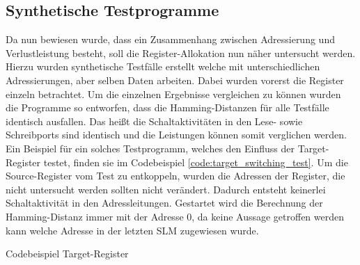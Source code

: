 \subsection{Synthetische Testprogramme}
Da nun bewiesen wurde, dass ein Zusammenhang zwischen Adressierung und Verlustleistung besteht, soll die Register-Allokation nun näher untersucht werden. Hierzu wurden synthetische Testfälle erstellt welche mit unterschiedlichen Adressierungen, aber selben Daten arbeiten. Dabei wurden vorerst die Register einzeln betrachtet. Um die einzelnen Ergebnisse vergleichen zu können wurden die Programme so entworfen, dass die Hamming-Distanzen für alle Testfälle identisch ausfallen. Das heißt die Schaltaktivitäten in den Lese- sowie Schreibports sind identisch und die Leistungen können somit verglichen werden. Ein Beispiel für ein solches Testprogramm, welches den Einfluss der Target-Register testet, finden sie im Codebeispiel \ref{code:target_switching_test}. Um die Source-Register vom Test zu entkoppeln, wurden die Adressen der Register, die nicht untersucht werden sollten nicht verändert. Dadurch entsteht keinerlei Schaltaktivität in den Adressleitungen. Gestartet wird die Berechnung der Hamming-Distanz immer mit der Adresse 0, da keine Aussage getroffen werden kann welche Adresse in der letzten SLM zugewiesen wurde.

\begin{algorithm}[H]
	\begin{algorithmic}[1]
		\caption{Codebeispiel Target-Register }
		\label{code:target_switching_test}
	\end{algorithmic}
\end{algorithm}

